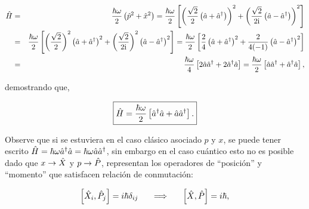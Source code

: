 \begin{solution}
\begin{eqnarray*}
\hat{H} &=&\frac{\hbar \omega }{2}\left( \hat{p}^{2}+\hat{x}^{2}\right) =\frac{\hbar \omega }{2}\left[ \left( \frac{\sqrt{2}}{2}\left( \hat{a}+\hat{a}^{\dagger }\right) \right)^{2}+\left( \frac{\sqrt{2}}{2\mathrm{i}}\left( \hat{a}-\hat{a}^{\dagger }\right) \right) ^{2} \right] \\
&=&\frac{\hbar \omega }{2}\left[ \left( \frac{\sqrt{2}}{2}\right) ^{2}\left(\hat{a}+\hat{a}^{\dagger }\right) ^{2}+\left( \frac{\sqrt{2}}{2 \mathrm{i}}\right) ^{2}\left(\hat{a}-\hat{a}^{\dagger }\right) ^{2}\right] =\frac{\hbar \omega }{2}\left[ \frac{2}{4}\left( \hat{a}+\hat{a}^{\dagger }\right) ^{2}+\frac{2}{4(-1)}\left( \hat{a}-\hat{a}^{\dagger}\right) ^{2}\right] \\
&=&\frac{\hbar \omega }{4}\left[ 2\hat{a} \hat{a}^{\dagger }+2\hat{a}^{\dagger }\hat{a}\right] =\frac{\hbar \omega }{2}\left[ \hat{a} \hat{a}^{\dagger }+\hat{a}^{\dagger } \hat{a}\right],
\end{eqnarray*}

demostrando que,

\begin{equation}
\boxed{
\hat{H}=\frac{\hbar \omega}{2}\left[ \hat{a}^{\dagger }\hat{a}+\hat{a} \hat{a}^{\dagger }\right].
\label{1.5}
}
\end{equation}
 \end{solution}

\vspace{0.3cm}
\noindent
Observe que si se estuviera en el caso cl\'{a}sico asociado $p$ y $x$, se puede tener escrito $\hat{H}=\hbar \omega \hat{a}^{\dagger } \hat{a}=\hbar \omega \hat{a} \hat{a}^{\dagger }$, sin embargo en el caso cu\'{a}ntico esto no es posible dado que $x\rightarrow \hat{X}$ y $p\rightarrow \hat{P}$, representan los operadores de ``posición'' y ``momento'' que satisfacen relaci\'{o}n de conmutaci\'{o}n:

\begin{equation}
\left[ \hat{X}_{i},\hat{P}_{j}\right] =i\hbar \delta _{ij}~\ \ \ \implies ~\ \ \ \left[\hat{X},\hat{P}\right] =i\hbar,  \label{1.6}
\end{equation}

